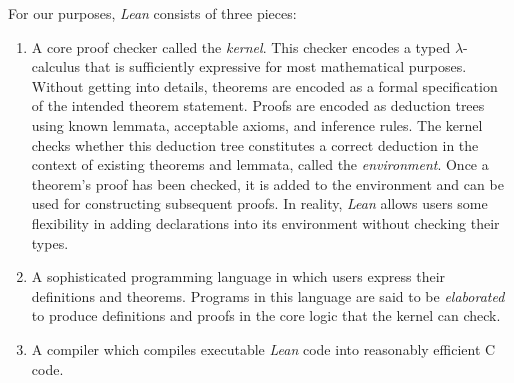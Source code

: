 For our purposes, \emph{Lean} consists of three pieces:
\begin{enumerate}
    \item A core proof checker called the \emph{kernel}. This checker encodes a typed $\lambda$-calculus that is sufficiently expressive for most mathematical purposes. Without getting into details, theorems are encoded as a formal specification of the intended theorem statement. Proofs are encoded as deduction trees using known lemmata, acceptable axioms, and inference rules. The kernel checks whether this deduction tree constitutes a correct deduction in the context of existing theorems and lemmata, called the \emph{environment}. Once a theorem's proof has been checked, it is added to the environment and can be used for constructing subsequent proofs. In reality, \emph{Lean} allows users some flexibility in adding declarations into its environment without checking their types.
    \item A sophisticated programming language in which users express their definitions and theorems. Programs in this language are said to be \emph{elaborated} to produce definitions and proofs in the core logic that the kernel can check.
    \item A compiler which compiles executable \emph{Lean} code into reasonably efficient C code.
\end{enumerate}

